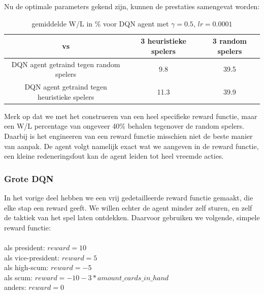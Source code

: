 \documentclass[11pt]{article}
\begin{document}
Nu de optimale parameters gekend zijn, kunnen de prestaties samengevat worden:
\begin{table}[H]
        \centering
        \begin{tabular}{|c|c|c|}
                \hline
                  vs           & 3 heuristieke spelers & 3 random spelers \\
                \hline
                 DQN agent getraind tegen random spelers & 9.8 & 39.5\\
                 DQN agent getraind tegen heuristieke spelers & 11.3 & 39.9\\
                \hline
        \end{tabular}
        \caption{gemiddelde W/L in \% voor DQN agent met $\gamma=0.5$, $lr=0.0001$}
\end{table}
\noindent Merk op dat we met het construeren van een heel specifieke reward functie, maar een W/L percentage van ongeveer 40\% behalen tegenover de random spelers. Daarbij is het engineeren van een reward functie misschien niet de beste manier van aanpak. De agent volgt namelijk exact wat we aangeven in de reward functie, een kleine redeneringsfout kan de agent leiden tot heel vreemde acties.
\subsubsection{Grote DQN}
In het vorige deel hebben we een vrij gedetailleerde reward functie gemaakt, die elke stap een reward geeft. We willen echter de agent minder zelf sturen, en zelf de taktiek van het spel laten ontdekken. Daarvoor gebruiken we volgende, simpele reward functie:\\\\
\indent als president: $reward = 10$\\
\indent als vice-president: $reward = 5$\\
\indent als high-scum: $reward = -5$\\
\indent als scum: $reward = -10 - 3*amount\_cards\_in\_hand$\\
\indent anders: $reward = 0$\\
\end{document}
